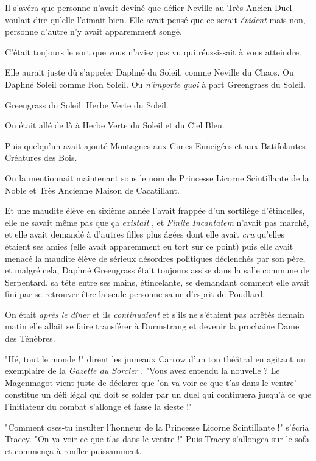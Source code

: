 Il s'avéra que personne n'avait deviné que défier Neville au Très Ancien Duel voulait dire qu'elle l'aimait bien. Elle avait pensé que ce serait \emph{évident}  mais non, personne d'autre n'y avait apparemment songé.

C'était toujours le sort que vous n'aviez pas vu qui réussissait à vous atteindre.

Elle aurait juste dû s'appeler Daphné du Soleil, comme Neville du Chaos. Ou Daphné Soleil comme Ron Soleil. Ou \emph{n'importe quoi } à part Greengrass du Soleil.

Greengrass du Soleil. Herbe Verte du Soleil.

On était allé de là à Herbe Verte du Soleil et du Ciel Bleu.

Puis quelqu'un avait ajouté Montagnes aux Cimes Enneigées et aux Batifolantes Créatures des Bois.

On la mentionnait maintenant sous le nom de Princesse Licorne Scintillante de la Noble et Très Ancienne Maison de Cacatillant.

Et une maudite élève en sixième année l'avait frappée d'un sortilège d'étincelles, elle ne savait même pas que ça \emph{existait} , et \emph{Finite Incantatem}  n'avait pas marché, et elle avait demandé à d'autres filles plus âgées dont elle avait \emph{cru}  qu'elles étaient ses amies (elle avait apparemment eu tort sur ce point) puis elle avait menacé la maudite élève de sérieux désordres politiques déclenchés par son père, et malgré cela, Daphné Greengrass était toujours assise dans la salle commune de Serpentard, sa tête entre ses mains, étincelante, se demandant comment elle avait fini par se retrouver être la seule personne saine d'esprit de Poudlard.

On était \emph{après le dîner}  et ils \emph{continuaient}  et s'ils ne s'étaient pas arrêtés demain matin elle allait se faire transférer à Durmstrang et devenir la prochaine Dame des Ténèbres.

"Hé, tout le monde !" dirent les jumeaux Carrow d'un ton théâtral en agitant un exemplaire de la \emph{Gazette du Sorcier} . "Vous avez entendu la nouvelle ? Le Magenmagot vient juste de déclarer que 'on va voir ce que t'as dans le ventre' constitue un défi légal qui doit se solder par un duel qui continuera jusqu'à ce que l'initiateur du combat s'allonge et fasse la sieste !"

"Comment oses-tu insulter l'honneur de la Princesse Licorne Scintillante !" s'écria Tracey. "On va voir ce que t'as dans le ventre !" Puis Tracey s'allongea sur le sofa et commença à ronfler puissamment.

